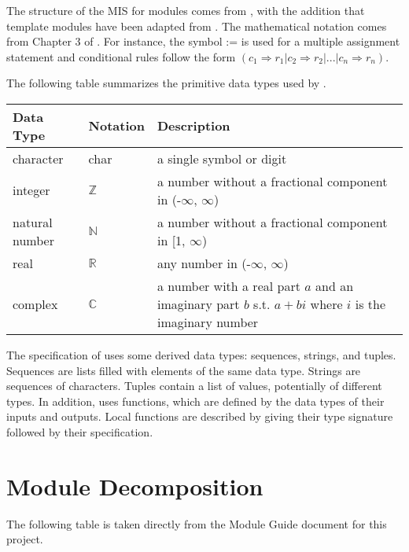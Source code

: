 \documentclass[12pt, titlepage]{article}
\begin{document}

The structure of the MIS for modules comes from \citet{HoffmanAndStrooper1995},
with the addition that template modules have been adapted from
\cite{GhezziEtAl2003}.  The mathematical notation comes from Chapter 3 of
\citet{HoffmanAndStrooper1995}.  For instance, the symbol := is used for a
multiple assignment statement and conditional rules follow the form $(c_1
\Rightarrow r_1 | c_2 \Rightarrow r_2 | ... | c_n \Rightarrow r_n )$.

The following table summarizes the primitive data types used by \progname. 

\begin{center}
\renewcommand{\arraystretch}{1.2}
\noindent 
\begin{tabular}{l l p{7.5cm}} 
\toprule 
\textbf{Data Type} & \textbf{Notation} & \textbf{Description}\\ 
\midrule
character & char & a single symbol or digit\\
integer & $\mathbb{Z}$ & a number without a fractional component in (-$\infty$, $\infty$) \\
natural number & $\mathbb{N}$ & a number without a fractional component in [1, $\infty$) \\
real & $\mathbb{R}$ & any number in (-$\infty$, $\infty$)\\
complex & $\mathbb{C}$ & a number with a real part $a$ and an imaginary part $b$ s.t. $a + bi$ where $i$ is the imaginary number\\
\bottomrule
\end{tabular} 
\end{center}

\noindent

The specification of \progname{} uses some derived data types: sequences, strings, and
tuples. Sequences are lists filled with elements of the same data type. Strings
are sequences of characters. Tuples contain a list of values, potentially of
different types. In addition, \progname{} uses functions, which
are defined by the data types of their inputs and outputs. Local functions are
described by giving their type signature followed by their specification.

\section{Module Decomposition}

The following table is taken directly from the Module Guide document for this project.
\end{document}
